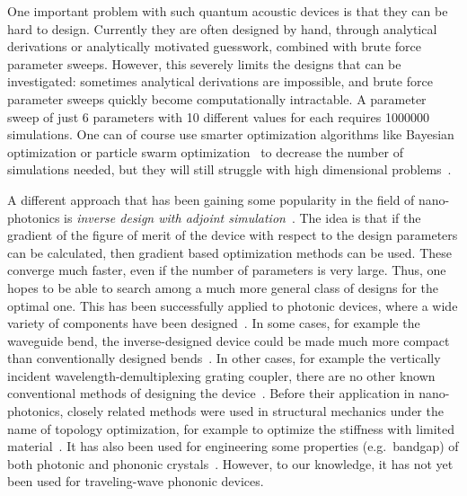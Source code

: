 One important problem with such quantum acoustic devices is that they can be hard to design.
Currently they are often designed by hand,
through analytical derivations or analytically motivated guesswork,
combined with brute force parameter sweeps.
However, this severely limits the designs that can be investigated:
sometimes analytical derivations are impossible, and brute force parameter
sweeps quickly become computationally intractable.
A parameter sweep of just 6 parameters with 10 different values for each
requires \num{1000000} simulations.
One can of course use smarter optimization algorithms like Bayesian optimization
or particle swarm optimization~\cite{schneider2019benchmarking,zhang_compact_2013}
to decrease the number of simulations needed,
but they will still struggle with high dimensional
problems~\cite{chen_measuring_2015}.

A different approach that has been gaining some popularity in the field of
nano-photonics is \emph{inverse design with adjoint
simulation}~\cite{molesky_inverse_2018}.
The idea is that if the gradient of the figure of merit of the device
with respect to the design parameters can be calculated, then gradient based
optimization methods can be used.
These converge much faster, even if the number of
parameters is very large. Thus, one hopes to be able to search
among a much more general class of designs for the optimal one.
This has been successfully applied to photonic devices,
where a wide variety of components have been designed~\cite{spins2019}.
In some cases, for example the waveguide bend, the inverse-designed device could
be made much more compact than conventionally designed
bends~\cite{jensen_systematic_2004}.
In other cases, for example the vertically incident wavelength-demultiplexing
grating coupler, there are no other known conventional methods of designing the
device~\cite{piggott_inverse_2014}.
Before their application in nano-photonics, closely related methods were used in
structural mechanics under the name of topology
optimization, for example to optimize the stiffness with limited material~\cite{sigmund_topology_2013}.
It has also been used for engineering some properties (e.g.\ bandgap) of
both photonic and phononic crystals~\cite{yi_comprehensive_2016}.
However, to our knowledge, it has not yet been used for traveling-wave phononic devices.

